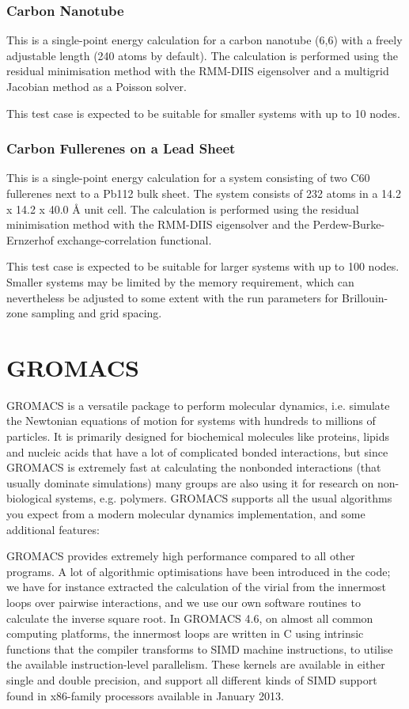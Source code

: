 \subsubsection{Carbon Nanotube}
This is a single-point energy calculation for a carbon nanotube (6,6) with a freely adjustable length (240 atoms by default). The calculation is performed using the residual minimisation method with the RMM-DIIS eigensolver and a multigrid Jacobian method as a Poisson solver.

This test case is expected to be suitable for smaller systems with up to 10 nodes.

\subsubsection{Carbon Fullerenes on a Lead Sheet}
This is a single-point energy calculation for a system consisting of two C60 fullerenes next to a Pb112 bulk sheet. The system consists of 232 atoms in a 14.2 x 14.2 x 40.0 Å unit cell. The calculation is performed using the residual minimisation method with the RMM-DIIS eigensolver and the Perdew-Burke-Ernzerhof exchange-correlation functional.

This test case is expected to be suitable for larger systems with up to 100 nodes. Smaller systems may be limited by the memory requirement, which can nevertheless be adjusted to some extent with the run parameters for Brillouin-zone sampling and grid spacing.


\section{GROMACS}
GROMACS is a versatile package to perform molecular dynamics, i.e. simulate the Newtonian equations of motion for systems with hundreds to millions of particles.
It is primarily designed for biochemical molecules like proteins, lipids and nucleic acids that have a lot of complicated bonded interactions, but since GROMACS is extremely fast at calculating the nonbonded interactions (that usually dominate simulations) many groups are also using it for research on non-biological systems, e.g. polymers.
GROMACS supports all the usual algorithms you expect from a modern molecular dynamics implementation, and some additional features:

GROMACS provides extremely high performance compared to all other programs. A lot of algorithmic optimisations have been introduced in the code; we have for instance extracted the calculation of the virial from the innermost loops over pairwise interactions, and we use our own software routines to calculate the inverse square root. In GROMACS 4.6, on almost all common computing platforms, the innermost loops are written in C using intrinsic functions that the compiler transforms to SIMD machine instructions, to utilise the available instruction-level parallelism. These kernels are available in either single and double precision, and support all different kinds of SIMD support found in x86-family processors available in January 2013.

